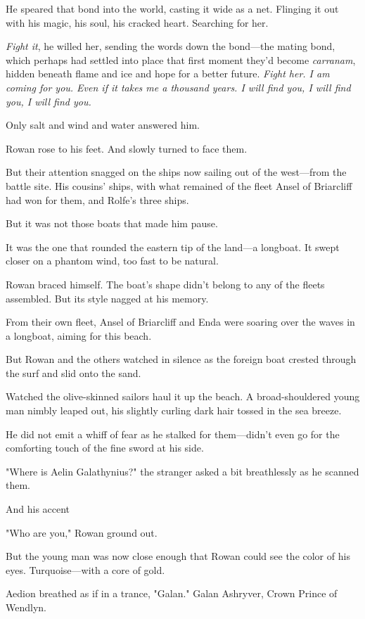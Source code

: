He speared that bond into the world, casting it wide as a net.
Flinging it out with his magic, his soul, his cracked heart.
Searching for her.

\emph{Fight it}, he willed her, sending the words down the bond---the mating bond, which perhaps had settled into place that first moment they'd become \emph{carranam}, hidden beneath flame and ice and hope for a better future.
\emph{Fight her.
I am coming for you.
Even if it takes me a thousand years.
I will find you, I will find you, I will find you.}

Only salt and wind and water answered him.

Rowan rose to his feet.
And slowly turned to face them.

But their attention snagged on the ships now sailing out of the west---from the battle site.
His cousins' ships, with what remained of the fleet Ansel of Briarcliff had won for them, and Rolfe's three ships.

But it was not those boats that made him pause.

It was the one that rounded the eastern tip of the land---a longboat.
It swept closer on a phantom wind, too fast to be natural.

Rowan braced himself.
The boat's shape didn't belong to any of the fleets assembled.
But its style nagged at his memory.

From their own fleet, Ansel of Briarcliff and Enda were soaring over the waves in a longboat, aiming for this beach.

But Rowan and the others watched in silence as the foreign boat crested through the surf and slid onto the sand.

Watched the olive-skinned sailors haul it up the beach.
A broad-shouldered young man nimbly leaped out, his slightly curling dark hair tossed in the sea breeze.

He did not emit a whiff of fear as he stalked for them---didn't even go for the comforting touch of the fine sword at his side.

"Where is Aelin Galathynius?"
the stranger asked a bit breathlessly as he scanned them.

And his accent 

"Who are you," Rowan ground out.

But the young man was now close enough that Rowan could see the color of his eyes.
Turquoise---with a core of gold.

Aedion breathed as if in a trance, "Galan."
Galan Ashryver, Crown Prince of Wendlyn.

